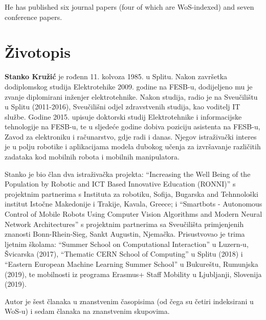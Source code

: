 \noindent He has published six journal papers (four of which are WoS-indexed) and seven conference papers.


\newpage \pagestyle{empty}

\section*{Životopis}

\vspace{15mm}

{\noindent\bf{Stanko Kružić}} je rođenn 11. kolvoza 1985. u Splitu. Nakon završetka dodiplomskog studija Elektrotehike 2009. godine na FESB-u, dodijeljeno mu je zvanje diplomirani inženjer elektrotehnike. Nakon studija, radio je na Sveučilištu u Splitu (2011-2016), Sveučilišni odjel zdravstvenih studija, kao voditelj IT službe. Godine 2015. upisuje doktorski studij Elektrotehnike i informacijske tehnologije na FESB-u, te u sljedeće godine dobiva poziciju asistenta na FESB-u, Zavod za elektroniku i računarstvo, gdje radi i danas. Njegov istraživački interes je u polju robotike i aplikacijama modela dubokog učenja za izvršavanje različitih zadataka kod mobilnih robota i mobilnih manipulatora. 

\noindent Stanko je bio član dva istraživačka projekta: ``Increasing the Well Being of the Population by Robotic and ICT Based Innovative Education (RONNI)'' s projektnim partnerima s Instituta za robotiku, Sofija, Bugarska and Tehnnološki institut Istočne Makedonije i Trakije, Kavala, Greece; i ``Smartbots - Autonomous Control of Mobile Robots Using Computer Vision Algorithms and Modern Neural Network Architectures'' s projektnim partnerima sa Sveučilišta primjenjenih znanosti Bonn-Rhein-Sieg, Sankt Augustin, Njemačka. Prisustvovao je trima ljetnim školama: ``Summer School on Computational Interaction'' u Luzern-u, Švicarska (2017), ``Thematic CERN School of Computing'' u Splitu (2018) i ``Eastern European Machine Learning Summer School'' u Bukureštu, Rumunjska (2019), te mobilnosti iz programa Erasmus+ Staff Mobility u Ljubljanji, Slovenija (2019).

\noindent Autor je šest članaka u znanstvenim časopisima (od čega su četiri indeksirani u WoS-u) i sedam članaka na znanstvenim skupovima.






\newpage 